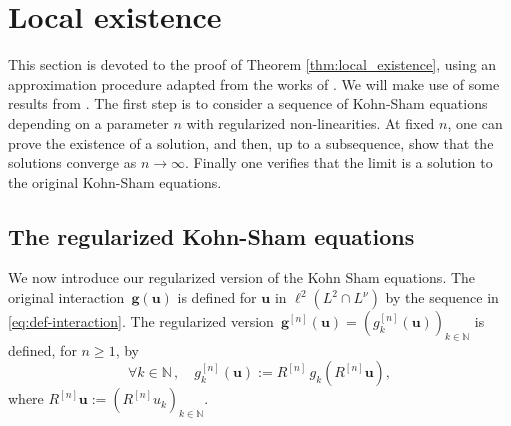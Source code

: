 \documentclass[12pt,a4paper]{amsart}
\numberwithin{equation}{section}
\newcommand{\ulu}{\boldsymbol{u}}
\newcommand{\ulg}{\boldsymbol{g}}
\begin{document}
	
	\section{Local existence} \label{sec:local-ex}
	
	This section is devoted to the proof of Theorem \ref{thm:local_existence}, using an approximation procedure adapted from the works of \cite{cazenave1988cauchy,strauss1970weak}. We will make use of some results from \cite{cazenave2003semilinear}.  The first step is to consider a sequence of Kohn-Sham equations depending on a parameter $n$ with regularized non-linearities. At fixed $n$, one can prove the existence of a solution, and then, up to a subsequence, show that the solutions converge as $n\to \infty$. Finally one verifies that the limit is a solution to the original Kohn-Sham equations. 
	
	\subsection{The regularized Kohn-Sham equations}
	
	We now introduce our regularized version of the Kohn Sham equations. The original interaction~$\ulg(\ulu)$ is defined for $ \ulu$  in $\ell^2 (L^2\cap L^{\nu}) $ by the sequence in \eqref{eq:def-interaction}. The regularized version~$\ulg^{[n]}(\ulu)=(g^{[n]}_{k}(\ulu))_{k\in\mathbb{N}}$ is defined, for $n\geq1$, by
	\begin{equation}
		\forall k \in \mathbb{N}\,,\quad g^{[n]}_{k}(\ulu) := R^{[n]} \, g_k( R^{[n]} \ulu ) ,
	\end{equation}
	where $R^{[n]}\ulu := (R^{[n]}u_k)_{k\in\mathbb{N}} $. 
	
\end{document}
